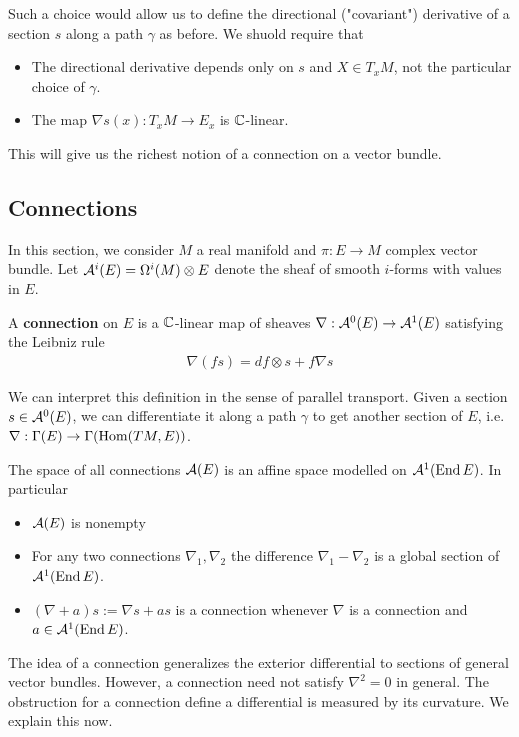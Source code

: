 \documentclass[12pt]{article}
\begin{document}
\hfill

Such a choice would allow us to define the directional ("covariant") derivative of a section $s$ along a path $\gamma$ 
as before. We shuold require that \begin{itemize}
    \item The directional derivative depends only on $s$ and $X\in T_xM$, not the particular 
    choice of $\gamma$.
    \item The map $\nabla s(x):T_xM\to E_x$ is $\mathbb{C}$-linear.
\end{itemize}
This will give us the richest notion of a connection on a vector bundle.
\subsection{Connections}
In this section, we consider $M$ a real manifold and $\pi:E\to M$ complex vector bundle.
Let ${\mathcal{A}}^i(E) = \Omega^i(M) \otimes E$ denote the sheaf of smooth $i$-forms with values in $E$.
\begin{definition}
    A \textbf{connection} on $E$ 
    is a $\mathbb{C}$-linear map of sheaves
    $\nabla:{\mathcal{A}}^0(E)\to{\mathcal{A}}^1(E)$ satisfying the Leibniz rule
    \begin{align*}
        \nabla(fs) = df\otimes s + f\nabla s
    \end{align*}
\end{definition}
We can interpret this definition in the sense of parallel transport. Given 
a section $s\in{\mathcal{A}}^0(E)$, we can differentiate it along a path $\gamma$ to get another 
section of $E$, i.e. $\nabla:\Gamma(E)\to \Gamma(\operatorname{Hom}(TM,E))$.
\begin{theorem}
    The space of all connections ${\mathcal{A}}(E)$ is an affine space modelled on ${\mathcal{A}}^1(\operatorname{End} E)$. In particular \begin{itemize}
        \item ${\mathcal{A}}(E)$ is nonempty
        \item For any two connections $\nabla_1,\nabla_2$ the difference $\nabla_1-\nabla_2$ 
        is a global section of ${\mathcal{A}}^1(\operatorname{End} E)$.
        \item $(\nabla + a)s := \nabla s + as$ is a connection whenever $\nabla$ is a connection and 
        $a\in{\mathcal{A}}^1(\operatorname{End} E)$.
    \end{itemize}
\end{theorem}
The idea of a connection generalizes the exterior differential to sections of general vector bundles. 
However, a connection need not satisfy $\nabla^2 = 0$ in general. The obstruction for a connection
define a differential is measured by its curvature. We explain this now.
\end{document}
